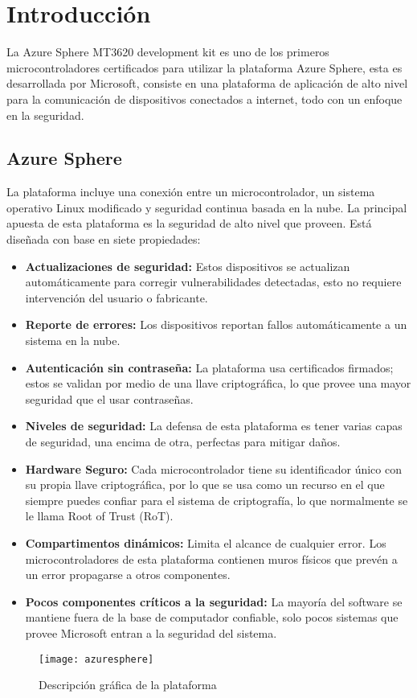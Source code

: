 \section{Introducción}

La Azure Sphere MT3620 development kit es uno de los primeros microcontroladores certificados para utilizar la plataforma Azure Sphere, esta es desarrollada por Microsoft, consiste en una plataforma de aplicación de alto nivel para la comunicación de dispositivos conectados a internet, todo con un enfoque en la seguridad.
\subsection{Azure Sphere}
La plataforma incluye una conexión entre un microcontrolador, un sistema operativo Linux modificado y seguridad continua basada en la nube. La principal apuesta de esta plataforma es la seguridad de alto nivel que proveen. Está diseñada con base en siete propiedades:
\begin{itemize}
	\item 
	\textbf{Actualizaciones de seguridad:} Estos dispositivos se actualizan automáticamente para corregir vulnerabilidades detectadas, esto no requiere intervención del usuario o fabricante.
	\item 
	\textbf{Reporte de errores:} Los dispositivos reportan fallos automáticamente a un sistema en la nube.
	\item
	\textbf{Autenticación sin contraseña:} La plataforma usa certificados firmados; estos se validan por medio de una llave criptográfica, lo que provee una mayor seguridad que el usar contraseñas.
	\item
	\textbf{Niveles de seguridad:} La defensa de esta plataforma es tener varias capas de seguridad, una encima de otra, perfectas para mitigar daños.
	\item
	\textbf{Hardware Seguro:} Cada microcontrolador tiene su identificador único con su propia llave criptográfica, por lo que se usa como un recurso en el que siempre puedes confiar para el sistema de criptografía, lo que normalmente se le llama Root of Trust (RoT).
	\item
	\textbf{Compartimentos dinámicos:}  Limita el alcance de cualquier error. Los microcontroladores de esta plataforma contienen muros físicos que prevén a un error propagarse a otros componentes.
	\item
	\textbf{Pocos componentes críticos a la seguridad:} La mayoría del software se mantiene fuera de la base de computador confiable, solo pocos sistemas que provee Microsoft entran a la seguridad del sistema.
\end{itemize}
\begin{figure}[h]
	\centering
	\texttt{[image: azuresphere]}
	\caption{Descripción gráfica de la plataforma}
\end{figure}